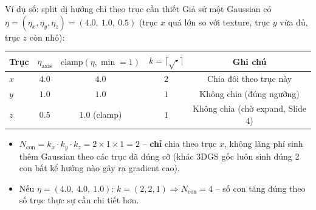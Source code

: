 \begin{frame}{Ví dụ số: split dị hướng chỉ theo trục cần thiết}
\footnotesize
Giả sử một Gaussian có $\eta = (\eta_x,\eta_y,\eta_z) = (4.0,\ 1.0,\ 0.5)$ (trục $x$ quá lớn so với texture, trục $y$ vừa đủ, trục $z$ còn nhỏ):
\vspace{0.15cm}
\centering
\begin{tabular}{lcccc}
\toprule
\textbf{Trục} & $\eta_{\text{axis}}$ & $\mathrm{clamp}(\eta,\min{=}1)$ & $k=\lceil\sqrt{\cdot}\rceil$ & Ghi chú \\
\midrule
$x$ & $4.0$ & $4.0$ & $2$ & Chia đôi theo trục này \\
$y$ & $1.0$ & $1.0$ & $1$ & Không chia (đúng ngưỡng) \\
$z$ & $0.5$ & $1.0$ (clamp) & $1$ & Không chia (chờ expand, Slide 4) \\
\bottomrule
\end{tabular}
\vspace{0.2cm}
\begin{itemize}
    \item $N_{\text{con}} = k_x \cdot k_y \cdot k_z = 2\times1\times1 = 2$ -- \textbf{chỉ} chia theo trục $x$, không lãng phí sinh thêm Gaussian theo các trục đã đúng cỡ (khác 3DGS gốc luôn sinh đúng 2 con bất kể hướng nào gây ra gradient cao).
    \item Nếu $\eta=(4.0,\ 4.0,\ 1.0)$: $k=(2,2,1) \Rightarrow N_{\text{con}}=4$ -- số con tăng đúng theo số trục thực sự cần chi tiết hơn.
\end{itemize}
\end{frame}

